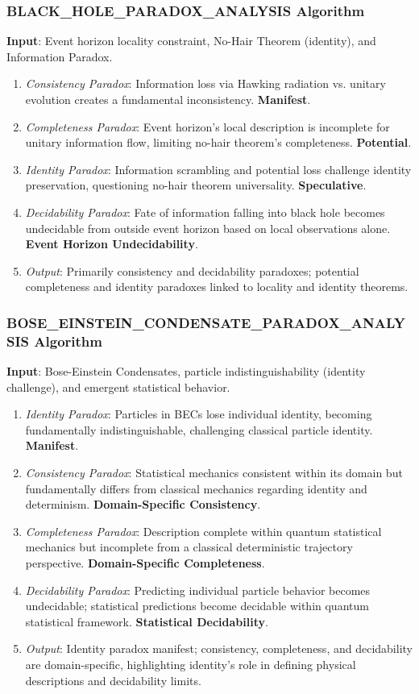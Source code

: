 \documentclass{article}
\begin{document}
	\subsubsection{BLACK\_HOLE\_PARADOX\_ANALYSIS Algorithm}
	\textbf{Input}: Event horizon locality constraint, No-Hair Theorem (identity), and Information Paradox.
	\begin{enumerate}
		\item \textit{Consistency Paradox}: Information loss via Hawking radiation vs. unitary evolution creates a fundamental inconsistency. \textbf{Manifest}.
		\item \textit{Completeness Paradox}: Event horizon's local description is incomplete for unitary information flow, limiting no-hair theorem's completeness. \textbf{Potential}.
		\item \textit{Identity Paradox}: Information scrambling and potential loss challenge identity preservation, questioning no-hair theorem universality. \textbf{Speculative}.
		\item \textit{Decidability Paradox}:  Fate of information falling into black hole becomes undecidable from outside event horizon based on local observations alone. \textbf{Event Horizon Undecidability}.
		\item \textit{Output}: Primarily consistency and decidability paradoxes; potential completeness and identity paradoxes linked to locality and identity theorems.
	\end{enumerate}
	
	\subsubsection{BOSE\_EINSTEIN\_CONDENSATE\_PARADOX\_ANALYSIS Algorithm}
	\textbf{Input}: Bose-Einstein Condensates, particle indistinguishability (identity challenge), and emergent statistical behavior.
	\begin{enumerate}
		\item \textit{Identity Paradox}:  Particles in BECs lose individual identity, becoming fundamentally indistinguishable, challenging classical particle identity. \textbf{Manifest}.
		\item \textit{Consistency Paradox}:  Statistical mechanics consistent within its domain but fundamentally differs from classical mechanics regarding identity and determinism. \textbf{Domain-Specific Consistency}.
		\item \textit{Completeness Paradox}:  Description complete within quantum statistical mechanics but incomplete from a classical deterministic trajectory perspective. \textbf{Domain-Specific Completeness}.
		\item \textit{Decidability Paradox}: Predicting individual particle behavior becomes undecidable; statistical predictions become decidable within quantum statistical framework. \textbf{Statistical Decidability}.
		\item \textit{Output}: Identity paradox manifest; consistency, completeness, and decidability are domain-specific, highlighting identity's role in defining physical descriptions and decidability limits.
	\end{enumerate}
	
\end{document}
